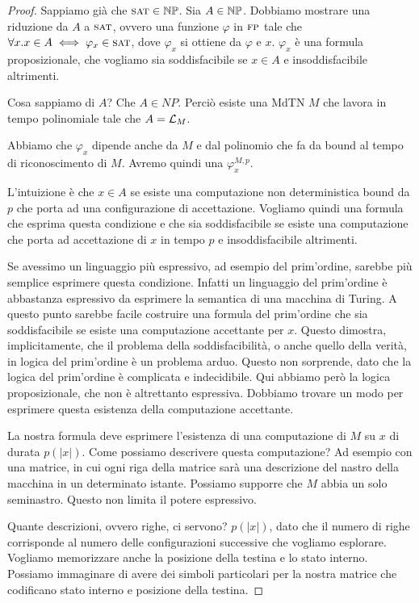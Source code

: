 \begin{proof}

    Sappiamo già che $\textsc{sat} \in \mathbb{NP}$. Sia $A \in \mathbb{NP}$. Dobbiamo mostrare una riduzione da
    $A$ a $\textsc{sat}$, ovvero una funzione $\varphi$ in $\textsc{fp}$ tale che $\forall x. x \in A \iff
    \varphi_{x} \in \textsc{sat}$, dove $\varphi_{x}$ si ottiene da $\varphi$ e $x$. $\varphi_{x}$ è una
    formula proposizionale, che vogliamo sia soddisfacibile se $x \in A$ e insoddisfacibile
    altrimenti.

    Cosa sappiamo di $A$? Che $A \in NP$. Perciò esiste una MdTN $M$ che lavora in tempo
    polinomiale tale che $A = \mathcal{L}_{M}$.

    Abbiamo che $\varphi_{x}$ dipende anche da $M$ e dal polinomio che fa da bound al tempo di
    riconoscimento di $M$. Avremo quindi una $\varphi_{x}^{M,p}$.

    L'intuizione è che $x \in A$ se esiste una computazione non deterministica bound da $p$ che
    porta ad una configurazione di accettazione. Vogliamo quindi una formula che esprima questa
    condizione e che sia soddisfacibile se esiste una computazione che porta ad accettazione di $x$
    in tempo $p$ e insoddisfacibile altrimenti.

    Se avessimo un linguaggio più espressivo, ad esempio del prim'ordine, sarebbe più semplice
    esprimere questa condizione. Infatti un linguaggio del prim'ordine è abbastanza espressivo da
    esprimere la semantica di una macchina di Turing. A questo punto sarebbe facile costruire una
    formula del prim'ordine che sia soddisfacibile se esiste una computazione accettante per $x$.
    Questo dimostra, implicitamente, che il problema della soddisfacibilità, o anche quello della
    verità, in logica del prim'ordine è un problema arduo. Questo non sorprende, dato che la
    logica del prim'ordine è complicata e indecidibile. Qui abbiamo però la logica proposizionale,
    che non è altrettanto espressiva.  Dobbiamo trovare un modo per esprimere questa esistenza
    della computazione accettante.

    La nostra formula deve esprimere l'esistenza di una computazione di $M$ su $x$ di durata
    $p(|x|)$. Come possiamo descrivere questa computazione? Ad esempio con una matrice, in cui ogni
    riga della matrice sarà una descrizione del nastro della macchina in un determinato istante.
    Possiamo supporre che $M$ abbia un solo seminastro. Questo non limita il potere espressivo.

    Quante descrizioni, ovvero righe, ci servono? $p(|x|)$, dato che il numero di righe corrisponde
    al numero delle configurazioni successive che vogliamo esplorare. Vogliamo memorizzare anche la
    posizione della testina e lo stato interno. Possiamo immaginare di avere dei simboli particolari
    per la nostra matrice che codificano stato interno e posizione della testina.


\end{proof}
